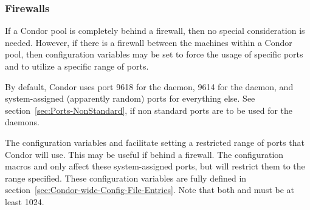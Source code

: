 % 
% 



\subsubsection{\label{sec:Ports-Firewalls}Firewalls}

If a Condor pool is completely behind a firewall,
then no special consideration is needed.
However, if there is a firewall between the machines within
a Condor pool, then
configuration variables may be set to force the usage of
specific ports and to utilize a specific range of ports.

By default,
Condor uses port 9618 for the  daemon,
9614 for the  daemon,
and system-assigned (apparently random) ports for everything else.
See section~\ref{sec:Ports-NonStandard},
if non standard ports are to be used for the
  daemons.

The configuration variables
 and  facilitate setting a restricted
range of ports that Condor will use.
This may be useful if behind a firewall.
The configuration macros
 and  only affect these
system-assigned ports, but will restrict them to the range specified.
These configuration variables are fully defined
in section~\ref{sec:Condor-wide-Config-File-Entries}.
Note that both  and  must be at least 1024.

